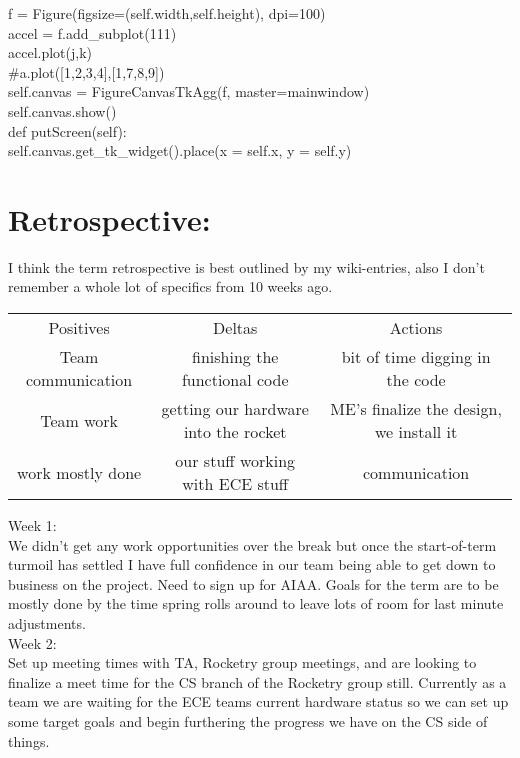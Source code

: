 \documentclass{article}
\begin{document}
            f = Figure(figsize=(self.width,self.height), dpi=100)\\
            accel = f.add\_subplot(111)\\
            accel.plot(j,k)\\
            \#a.plot([1,2,3,4],[1,7,8,9])\\

            self.canvas = FigureCanvasTkAgg(f, master=mainwindow)\\
            self.canvas.show()\\

        def putScreen(self):\\
            self.canvas.get\_tk\_widget().place(x = self.x, y = self.y)\\

\section{Retrospective:}

I think the term retrospective is best outlined by my wiki-entries, also I don't remember a whole lot of specifics from 10 weeks ago.\\

\begin{center}
\begin{tabular}{ c c c }
 Positives & Deltas & Actions \\ 
 Team communication & finishing the functional code & bit of time digging in the code \\  
 Team work & getting our hardware into the rocket & ME's finalize the design, we install it \\
work mostly done & our stuff working with ECE stuff & communication \\
\end{tabular}
\end{center}


Week 1:\\
We didn't get any work opportunities over the break but once the start-of-term turmoil has settled I have full confidence in our team being able to get down to business on the project. Need to sign up for AIAA. Goals for the term are to be mostly done by the time spring rolls around to leave lots of room for last minute adjustments.\\

Week 2:\\
Set up meeting times with TA, Rocketry group meetings, and are looking to finalize a meet time for the CS branch of the Rocketry group still. Currently as a team we are waiting for the ECE teams current hardware status so we can set up some target goals and begin furthering the progress we have on the CS side of things.\\
\end{document}
